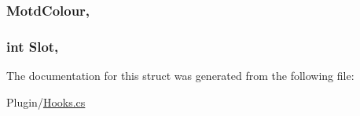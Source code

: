\subsubsection[{Motd\+Colour}]{ Motd\+Colour\hspace{0.3cm}{\ttfamily [get]}, {\ttfamily [set]}}\label{structOTA_1_1Plugin_1_1HookArgs_1_1PlayerPreGreeting_a00aeeb6a2307fcf4d9fec2c938509e2c}
\hypertarget{structOTA_1_1Plugin_1_1HookArgs_1_1PlayerPreGreeting_a845a62ef01927ccc8bd45a41de3996f1}{}
\subsubsection[{Slot}]{\setlength{\rightskip}{0pt plus 5cm}int Slot\hspace{0.3cm}{\ttfamily [get]}, {\ttfamily [set]}}\label{structOTA_1_1Plugin_1_1HookArgs_1_1PlayerPreGreeting_a845a62ef01927ccc8bd45a41de3996f1}


The documentation for this struct was generated from the following file\+:\begin{DoxyCompactItemize}
\item 
Plugin/\hyperlink{Hooks_8cs}{Hooks.\+cs}\end{DoxyCompactItemize}
